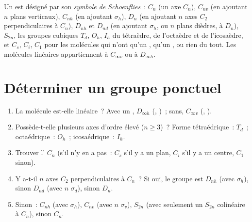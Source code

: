 \begin{definition}\label{def:b3:point-groups:schoenflies}
Un  est désigné par son \emph{symbole de Schoenflies}~:
$C_n$ (un axe $C_n$), $C_{nv}$ (en ajoutant $n$ plans verticaux), $C_{nh}$
(en ajoutant $\sigma_h$), $D_n$ (en ajoutant $n$ axes $C_2$
perpendiculaires à $C_n$), $D_{nh}$
et $D_{nd}$ (en ajoutant $\sigma_h$, ou $n$ plans dièdres, à $D_n$),
$S_{2n}$, les
groupes cubiques $T_d$, $O_h$, $I_h$ du tétraèdre, de l'octaèdre et de
l'icosaèdre, et $C_s$, $C_i$, $C_1$ pour les molécules qui n'ont qu'un
, qu'un , ou rien du tout. Les
molécules linéaires appartiennent à
$C_{\infty v}$ ou à $D_{\infty h}$.
\end{definition}

\section{Déterminer un groupe ponctuel}

\begin{method}\label{met:b3:point-groups:assign}
\begin{enumerate}
  \item La molécule est-elle linéaire~? Avec un ,
        $D_{\infty h}$
        (, )~; sans, $C_{\infty v}$ (, ).
  \item Possède-t-elle plusieurs axes d'ordre élevé ($n \ge 3$)~? Forme
        tétraédrique~:
        $T_d$~; octaédrique~: $O_h$~; icosaédrique~: $I_h$.
  \item Trouver l' $C_n$ (s'il n'y en a pas~: $C_s$ s'il y a
        un plan, $C_i$ s'il y a un centre, $C_1$ sinon).
  \item Y a-t-il $n$ axes $C_2$ perpendiculaires à $C_n$~? Si oui, le
        groupe est
        $D_{nh}$ (avec $\sigma_h$), sinon $D_{nd}$ (avec $n$ $\sigma_d$),
        sinon $D_n$.
  \item Sinon~: $C_{nh}$ (avec $\sigma_h$), $C_{nv}$ (avec $n$ $\sigma_v$), $S_{2n}$
        (avec seulement un $S_{2n}$ colinéaire à $C_n$), sinon $C_n$.
\end{enumerate}
\end{method}

